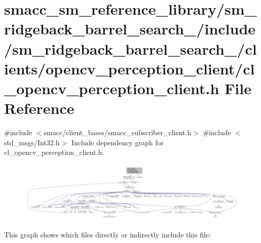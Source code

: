 \hypertarget{sm__ridgeback__barrel__search__2_2include_2sm__ridgeback__barrel__search__2_2clients_2opencv__pe24e75f1355e9d616b476e09c054758fe}{}\section{smacc\+\_\+sm\+\_\+reference\+\_\+library/sm\+\_\+ridgeback\+\_\+barrel\+\_\+search\+\_/include/sm\+\_\+ridgeback\+\_\+barrel\+\_\+search\+\_/clients/opencv\+\_\+perception\+\_\+client/cl\+\_\+opencv\+\_\+perception\+\_\+client.h File Reference}
\label{sm__ridgeback__barrel__search__2_2include_2sm__ridgeback__barrel__search__2_2clients_2opencv__pe24e75f1355e9d616b476e09c054758fe}
{\ttfamily \#include $<$smacc/client\+\_\+bases/smacc\+\_\+subscriber\+\_\+client.\+h$>$}\newline
{\ttfamily \#include $<$std\+\_\+msgs/\+Int32.\+h$>$}\newline
Include dependency graph for cl\+\_\+opencv\+\_\+perception\+\_\+client.\+h\+:
\nopagebreak
\begin{figure}[H]
\begin{center}
\leavevmode
\includegraphics[width=350pt]{sm__ridgeback__barrel__search__2_2include_2sm__ridgeback__barrel__search__2_2clients_2opencv__pe659f31dc1a0564c40c9a05f7c6ee8229}
\end{center}
\end{figure}
This graph shows which files directly or indirectly include this file\+:
\nopagebreak
